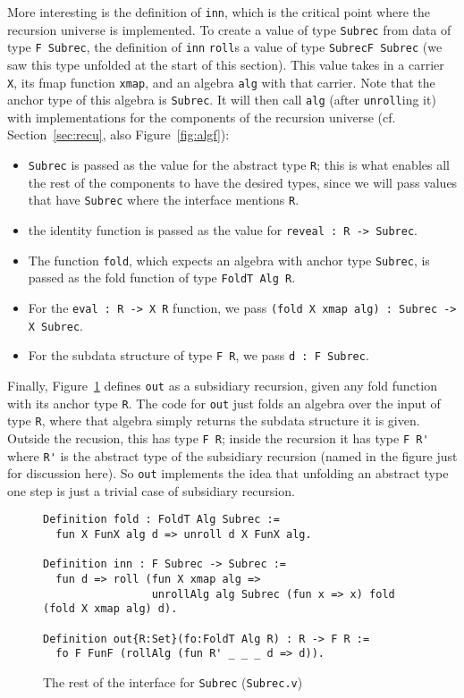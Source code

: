 \documentclass[a4paper,USenglish]{lipics-v2021}
\begin{document}
More interesting is the definition of \verb|inn|, which is the
critical point where the recursion universe is implemented.  To create
a value of type \verb|Subrec| from data of type \verb|F Subrec|, the
definition of \verb|inn| \verb|roll|s a value of type
\verb|SubrecF Subrec| (we saw this type unfolded at the start of
this section).  This value takes in a carrier
\verb|X|, its fmap function \verb|xmap|, and an algebra \verb|alg|
with that carrier.  Note that the anchor type of this algebra is
\verb|Subrec|.  It will then call \verb|alg| (after \verb|unroll|ing
it) with implementations for the components of the recursion universe
(cf. Section~\ref{sec:recu}, also Figure~\ref{fig:algf}):
\begin{itemize}
\item \verb|Subrec| is passed as the value for the abstract type \verb|R|; this is what enables all
  the rest of the components to have the desired types, since we will pass values that have \verb|Subrec|
  where the interface mentions \verb|R|.
\item the identity function is passed as the value for \verb|reveal : R -> Subrec|.
\item The function \verb|fold|, which expects an algebra with anchor type \verb|Subrec|, is passed as
  the fold function of type \verb|FoldT Alg R|. 
\item For the \verb|eval : R -> X R| function, we pass \verb|(fold X xmap alg) : Subrec -> X Subrec|.
\item For the subdata structure of type \verb|F R|, we pass \verb|d : F Subrec|. 
\end{itemize}

Finally, Figure~\ref{fig:subrecb} defines \verb|out| as a subsidiary
recursion, given any fold function with its anchor type \verb|R|.  The
code for \verb|out| just folds an algebra over the input of type
\verb|R|, where that algebra simply returns the subdata structure it
is given.  Outside the recusion, this has type \verb|F R|; inside the
recursion it has type \verb|F R'| where \verb|R'| is the abstract type
of the subsidiary recursion (named in the figure just for discussion
here).  So \verb|out| implements the idea that unfolding an abstract
type one step is just a trivial case of subsidiary recursion.

\begin{figure}
\begin{verbatim}
Definition fold : FoldT Alg Subrec := 
  fun X FunX alg d => unroll d X FunX alg.

Definition inn : F Subrec -> Subrec :=
  fun d => roll (fun X xmap alg =>
                 unrollAlg alg Subrec (fun x => x) fold (fold X xmap alg) d).

Definition out{R:Set}(fo:FoldT Alg R) : R -> F R :=
  fo F FunF (rollAlg (fun R' _ _ _ d => d)).
\end{verbatim}
\caption{The rest of the interface for \texttt{Subrec} (\texttt{Subrec.v})}
\label{fig:subrecb}
\end{figure}
\end{document}
